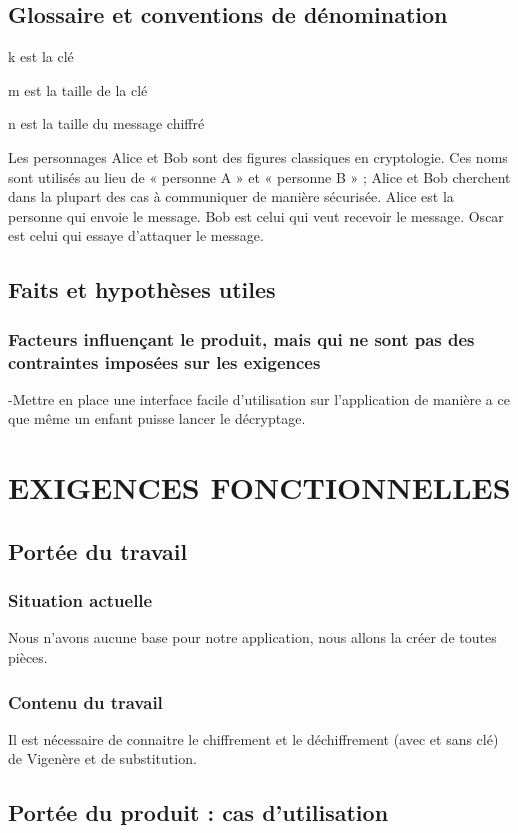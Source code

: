 \documentclass[a4]{article}
\begin{document}
		\subsection{Glossaire et conventions de dénomination}
		
			k est la clé

			m est la taille de la clé

			n est la taille du message chiffré
			
			Les personnages Alice et Bob sont des figures classiques en cryptologie. Ces noms sont utilisés au lieu de « personne A » et « personne B » ; Alice et Bob cherchent dans la plupart des cas à communiquer de manière sécurisée.
			Alice est la personne qui envoie le message.
			Bob est celui qui veut recevoir le message.
			Oscar est celui qui essaye d'attaquer le message.
		\subsection{Faits et hypothèses utiles}	
			\subsubsection{Facteurs influençant le produit, mais qui ne sont pas des contraintes imposées sur les exigences}
	
				-Mettre en place une interface facile d'utilisation sur l'application de manière a ce que même un enfant puisse lancer le décryptage.
	\section{EXIGENCES FONCTIONNELLES}
		\subsection{Portée du travail}
			\subsubsection{Situation actuelle}
				Nous n'avons aucune base pour notre application, nous allons la créer de toutes pièces.
			\subsubsection{Contenu du travail}
				Il est nécessaire de connaitre le chiffrement et le déchiffrement (avec et sans clé) de Vigenère et de substitution.
		\subsection{Portée du produit : cas d’utilisation}
\end{document}
